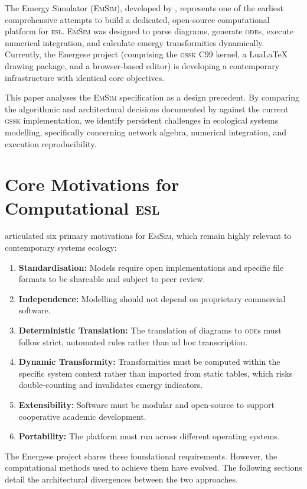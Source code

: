 \documentclass[3p,times,authoryear]{elsarticle}
\newcommand{\gssk}{\textsc{gssk}}
\newcommand{\esl}{\textsc{esl}}
\newcommand{\emsim}{\textsc{EmSim}}
\begin{document}
The Emergy Simulator (\emsim), developed by \citet{valyi2004}, represents one of the earliest comprehensive attempts to build a dedicated, open-source computational platform for \esl. \emsim{} was designed to parse diagrams, generate \textsc{ode}s, execute numerical integration, and calculate emergy transformities dynamically. Currently, the Energese project (comprising the \gssk{} C99 kernel, a LuaLaTeX drawing package, and a browser-based editor) is developing a contemporary infrastructure with identical core objectives. 

This paper analyses the \emsim{} specification as a design precedent. By comparing the algorithmic and architectural decisions documented by \citet{valyi2004} against the current \gssk{} implementation, we identify persistent challenges in ecological systems modelling, specifically concerning network algebra, numerical integration, and execution reproducibility.

\section{Core Motivations for Computational \esl}
\label{sec:motivations}

\citet{valyi2004} articulated six primary motivations for \emsim, which remain highly relevant to contemporary systems ecology:
\begin{enumerate}
    \item \textbf{Standardisation:} Models require open implementations and specific file formats to be shareable and subject to peer review.
    \item \textbf{Independence:} Modelling should not depend on proprietary commercial software.
    \item \textbf{Deterministic Translation:} The translation of diagrams to \textsc{ode}s must follow strict, automated rules rather than ad hoc transcription.
    \item \textbf{Dynamic Transformity:} Transformities must be computed within the specific system context rather than imported from static tables, which risks double-counting and invalidates emergy indicators.
    \item \textbf{Extensibility:} Software must be modular and open-source to support cooperative academic development.
    \item \textbf{Portability:} The platform must run across different operating systems.
\end{enumerate}

The Energese project shares these foundational requirements. However, the computational methods used to achieve them have evolved. The following sections detail the architectural divergences between the two approaches.
\end{document}
